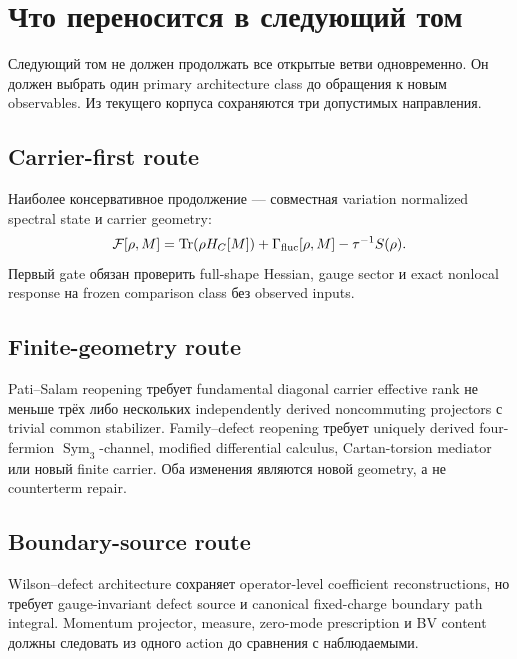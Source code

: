 \section{Что переносится в следующий том}

Следующий том не должен продолжать все открытые ветви одновременно. Он
должен выбрать один primary architecture class до обращения к новым
observables. Из текущего корпуса сохраняются три допустимых направления.

\subsection{Carrier-first route}

Наиболее консервативное продолжение --- совместная variation normalized
spectral state и carrier geometry:
\begin{equation}
 \mathcal F[\rho,M]
 =\operatorname{Tr}(\rho H_C[M])
 +\Gamma_{\rm fluc}[\rho,M]
 -\tau^{-1}S(\rho).
\end{equation}
Первый gate обязан проверить full-shape Hessian, gauge sector и exact
nonlocal response на frozen comparison class без observed inputs.

\subsection{Finite-geometry route}

Pati--Salam reopening требует fundamental diagonal carrier effective rank
не меньше трёх либо нескольких independently derived noncommuting
projectors с trivial common stabilizer. Family--defect reopening требует
uniquely derived four-fermion \(\operatorname{Sym}_3\)-channel, modified
differential calculus, Cartan-torsion mediator или новый finite carrier.
Оба изменения являются новой geometry, а не counterterm repair.

\subsection{Boundary-source route}

Wilson--defect architecture сохраняет operator-level coefficient
reconstructions, но требует gauge-invariant defect source и canonical
fixed-charge boundary path integral. Momentum projector, measure, zero-mode
prescription и BV content должны следовать из одного action до сравнения с
наблюдаемыми.

